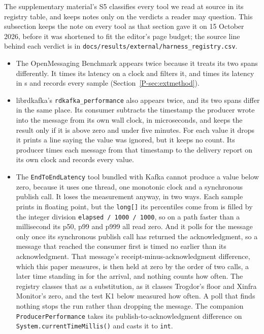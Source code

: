 \documentclass[10pt,journal,onecolumn]{IEEEtran}
\newcommand{\kafka}{Kafka}
\newcommand{\mainGuard}{\ref{P-sec:extmethod}}            %
\begin{document}
The supplementary material's S5 classifies every tool we read at source in its registry table, and
keeps notes only on the verdicts a reader may question. This subsection keeps the note on every
tool as that section gave it on 15 October 2026, before it was shortened to fit the editor's page
budget; the source line behind each verdict is in \texttt{docs/results/external/harness\_registry.csv}.
\begin{itemize}
\item The OpenMessaging Benchmark appears twice because it treats its two spans differently. It
times its \ombGuardedPath{} latency on a \ombGuardedClock{} clock and filters it, and times its
\ombUnguardedPath{} latency in \ombUnguardedClock{}s and records every sample
(Section~\mainGuard{}).
\item librdkafka's \texttt{rdkafka\_performance} also appears twice, and its two spans differ in the
same place. Its consumer subtracts the timestamp the producer wrote into the message from its own
wall clock, in microseconds, and keeps the result only if it is above zero and under five minutes.
For each value it drops it prints a line saying the value was ignored, but it keeps no count. Its
producer times each message from that timestamp to the delivery report on its own clock and
records every value.
\item The \texttt{EndToEndLatency} tool bundled with \kafka{} cannot produce a value below zero,
because it uses one thread, one monotonic clock and a synchronous publish call. It loses the
measurement anyway, in two ways. Each sample prints in floating point, but the \texttt{long[]} its
percentiles come from is filled by the integer division \texttt{elapsed / 1000 / 1000}, so on a
path faster than a millisecond its p50, p99 and p999 all read zero. And it polls for the message
only once its synchronous publish call has returned the acknowledgment, so a message that reached
the consumer first is timed no earlier than its acknowledgment. That message's
receipt-minus-acknowledgment difference, which this paper measures, is then held at zero by the
order of two calls, a later time standing in for the arrival, and nothing counts how often. The
registry classes that as a substitution, as it classes Trogdor's floor and Xinfra Monitor's zero,
and the test K1 below measured how often. A poll that finds
nothing stops the run rather than dropping the message. The companion
\texttt{ProducerPerformance} takes its publish-to-acknowledgment difference on
\texttt{System.currentTimeMillis()} and casts it to \texttt{int}.

\end{itemize}
\end{document}
